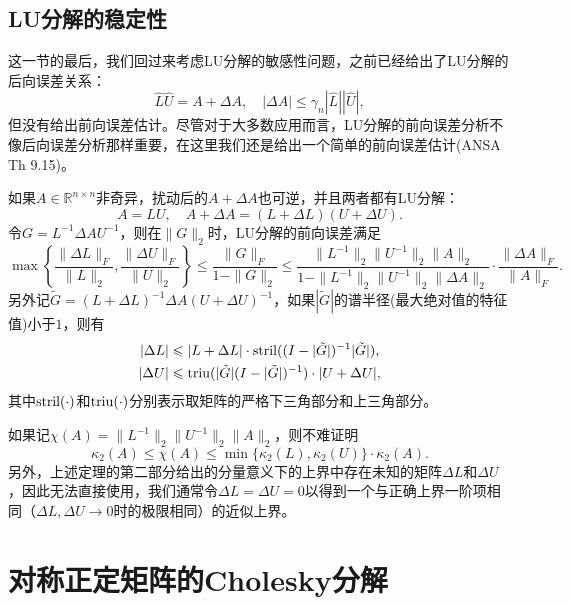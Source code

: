 \documentclass[a4paper,10pt]{ctexart}
\begin{document}
\subsection{LU分解的稳定性}
这一节的最后，我们回过来考虑LU分解的敏感性问题，之前已经给出了LU分解的后向误差关系：
\[
    \hat{L} \hat{U} = A + \Delta A,\quad |\Delta A| \leqslant \gamma_{n} |\hat{L}| |\hat{U}|,
\]
但没有给出前向误差估计。尽管对于大多数应用而言，LU分解的前向误差分析不像后向误差分析那样重要，在这里我们还是给出一个简单的前向误差估计(ANSA Th 9.15)。
\begin{theorem}
    如果$ A\in \mathbb{R}^{n\times n} $非奇异，扰动后的$ A+\Delta A $也可逆，并且两者都有LU分解：
    \[
        A = LU, \quad A+\Delta A = (L+\Delta L)(U +\Delta U).
    \]
    令$ G = L^{-1}\Delta A U^{-1} $，则在$ \| G \|_2 $时，LU分解的前向误差满足
    \begin{equation}
        \max\left\{ \frac{\| \Delta L \|_F }{\| L \|_2}, \frac{\| \Delta U \|_F }{\| U \|_2} \right\} 
        \leqslant \frac{\| G \|_F}{1-\| G \|_2}\leqslant 
        \frac{\| L^{-1} \|_2 \| U^{-1} \|_2 \| A \|_2}{1-\| L^{-1} \|_2 \| U^{-1} \|_2 \| \Delta A \|_2} \cdot \frac{\| \Delta A \|_F}{\| A \|_F}.
    \end{equation}
    另外记$ \tilde{G} = (L+\Delta L)^{-1} \Delta A (U+\Delta U)^{-1} $，如果$ |\tilde{G}| $的谱半径(最大绝对值的特征值)小于$ 1 $，则有
    \begin{equation}
        \begin{aligned}
            |\Delta L|&\leqslant |L+\Delta L|\cdot {\rm stril}((I-|\tilde{G}|)^{-1}|\tilde{G}|),\\
            |\Delta U|&\leqslant {\rm triu}(|\tilde{G}|(I-|\tilde{G}|)^{-1}) \cdot |U+\Delta U|,
        \end{aligned}
    \end{equation}
    其中$ {\rm stril}(\cdot) $和$ {\rm triu}(\cdot) $分别表示取矩阵的严格下三角部分和上三角部分。
\end{theorem}

如果记$ \chi(A) = \| L^{-1} \|_2 \| U^{-1} \|_2 \| A \|_2 $，则不难证明
\[
    \kappa_2(A)\leqslant \chi(A)\leqslant \min\{\kappa_2(L), \kappa_2(U)\}\cdot \kappa_2(A).
\]
另外，上述定理的第二部分给出的分量意义下的上界中存在未知的矩阵$ \Delta L $和$ \Delta U $，因此无法直接使用，我们通常令$ \Delta L = \Delta U = 0 $以得到一个与正确上界一阶项相同（$ \Delta L, \Delta U\to 0 $时的极限相同）的近似上界。

\section{对称正定矩阵的Cholesky分解}
\end{document}
